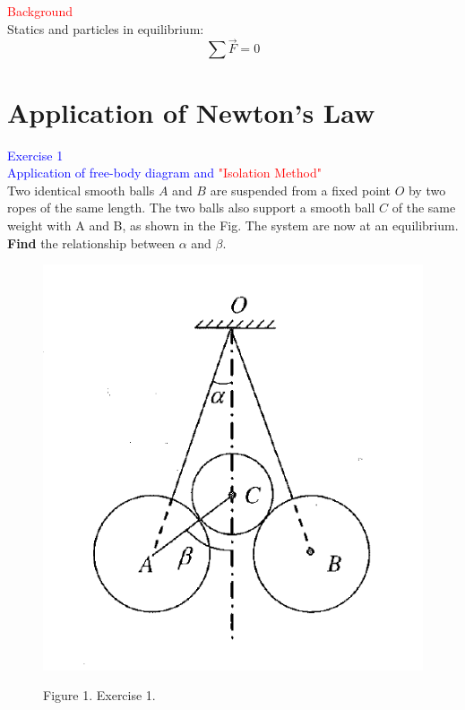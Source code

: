 \documentclass{beamer}
\begin{document}
\begin{frame}
\textcolor{red}{Background}\\
Statics and particles in equilibrium:\\
$$
  \sum{\vec{F}} = 0%
$$

\section{Application of Newton's Law}
\textcolor{blue}{Exercise 1}\\
\textcolor{blue}{\footnotesize{Application of free-body diagram and \textcolor{red}{"Isolation Method"}}}\\
Two identical smooth balls $A$ and $B$ are suspended from a fixed point $O$ by two ropes of the same length. The two balls also support a smooth ball $C$ of the same weight with A and B, as shown in the Fig. The system are now at an equilibrium. \textbf{Find} the relationship between $\alpha$ and $\beta$.
\end{frame}

\begin{frame}
  \begin{figure}[H]
    \centering
    \includegraphics[width=0.4 \linewidth, angle =0]{ex1.png}
    \begin{center}
      Figure 1. Exercise 1.
    \end{center}
    \label{fig:4}
    \end{figure}
\end{frame}
\end{document}

